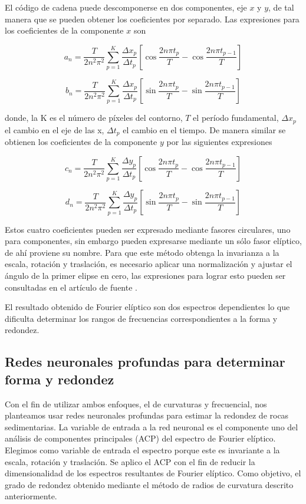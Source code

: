 \documentclass[conference]{IEEEtran}
\begin{document}
El código de cadena puede descomponerse en dos componentes, eje $x$ y $y$, de tal manera que se pueden obtener los coeficientes por separado. Las expresiones para
los coeficientes de la componente \(x\) son

\begin{equation}
a_n = \frac{T}{2n^2\pi^2}\sum_{p = 1}^{K}\frac{\Delta x_p}{\Delta t_p}[\cos{\frac{2n\pi t_p}{T}} - \cos{\frac{2n\pi t_{p-1}}{T}}] \label{eq2}
\end{equation}

\begin{equation}
b_n = \frac{T}{2n^2\pi^2}\sum_{p = 1}^{K}\frac{\Delta x_p}{\Delta t_p}[\sin{\frac{2n\pi t_p}{T}} - \sin{\frac{2n\pi t_{p-1}}{T}}] \label{eq3}
\end{equation}

donde, la K es el número de píxeles del contorno, \(T\) el período fundamental, \(\Delta x_p\) el cambio en el eje de las x, \(\Delta t_p\) el cambio en el tiempo. De manera similar se obtienen los coeficientes de la componente \(y\) por las siguientes expresiones

\begin{equation}
c_n = \frac{T}{2n^2\pi^2}\sum_{p = 1}^{K}\frac{\Delta y_p}{\Delta t_p}[\cos{\frac{2n\pi t_p}{T}} - \cos{\frac{2n\pi t_{p-1}}{T}}] \label{eq4}
\end{equation}

\begin{equation}
d_n = \frac{T}{2n^2\pi^2}\sum_{p = 1}^{K}\frac{\Delta y_p}{\Delta t_p}[\sin{\frac{2n\pi t_p}{T}} - \sin{\frac{2n\pi t_{p-1}}{T}}] \label{eq5}
\end{equation}

Estos cuatro coeficientes pueden ser expresado mediante fasores circulares, uno para componentes, sin embargo pueden expresarse mediante un sólo fasor elíptico, de ahí proviene su nombre. Para que este método obtenga la invarianza a la escala, rotación y traslación, es necesario aplicar una normalización y ajustar el ángulo de la primer elipse en cero, las expresiones para lograr esto pueden ser consultadas en el artículo de fuente \cite{b10}. 

El resultado obtenido de Fourier elíptico son dos espectros dependientes lo que dificulta determinar los rangos de frecuencias correspondientes a la forma y redondez. 
  
\subsection{Redes neuronales profundas para determinar forma y redondez}\label{AA}
Con el fin de utilizar ambos enfoques, el de curvaturas y frecuencial, nos planteamos usar redes neuronales profundas para estimar la redondez de rocas sedimentarias. La variable de entrada a la red neuronal es el componente uno del análisis de componentes principales (ACP) del espectro de Fourier elíptico. Elegimos como variable de entrada el espectro porque este es invariante a la escala, rotación y traslación. Se aplico el ACP con el fin de reducir la dimensionalidad de los espectros resultantes de Fourier elíptico. Como objetivo, el grado de redondez obtenido mediante el método de radios de curvatura descrito anteriormente. 
\end{document}

